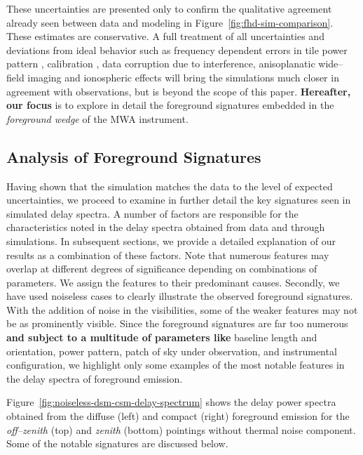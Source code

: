 \documentclass[preprint2,iop,numberedappendix]{emulateapj}
\begin{document}
These uncertainties are presented only to confirm the qualitative agreement already seen between data and modeling in Figure~\ref{fig:fhd-sim-comparison}. These estimates are conservative. A full treatment of all uncertainties and deviations from ideal behavior such as frequency dependent errors in tile power pattern \citep{ber15}, calibration \citep{dat10}, data corruption due to interference, anisoplanatic wide--field imaging and ionospheric effects \citep{int09} will bring the simulations much closer in agreement with observations, but is beyond the scope of this paper. {\bf Hereafter, our focus} is to explore in detail the foreground signatures embedded in the {\it foreground wedge} of the MWA instrument.

\subsection{Analysis of Foreground Signatures}\label{sec:FG-analysis}

Having shown that the simulation matches the data to the level of expected uncertainties, we proceed to examine in further detail the key signatures seen in simulated delay spectra. A number of factors are responsible for the characteristics noted in the delay spectra obtained from data and through simulations. In subsequent sections, we provide a detailed explanation of our results as a combination of these factors. Note that numerous features may overlap at different degrees of significance depending on combinations of parameters. We assign the features to their predominant causes. Secondly, we have used noiseless cases to clearly illustrate the observed foreground signatures. With the addition of noise in the visibilities, some of the weaker features may not be as prominently visible. Since the foreground signatures are far too numerous {\bf and subject to a multitude of parameters like} baseline length and orientation, power pattern, patch of sky under observation, and instrumental configuration, we highlight only some examples of the most notable features in the delay spectra of foreground emission.

Figure~\ref{fig:noiseless-dsm-csm-delay-spectrum} shows the delay power spectra obtained from the diffuse (left) and compact (right) foreground emission for the {\it off--zenith} (top) and {\it zenith} (bottom) pointings without thermal noise component. Some of the notable signatures are discussed below.
\end{document}
